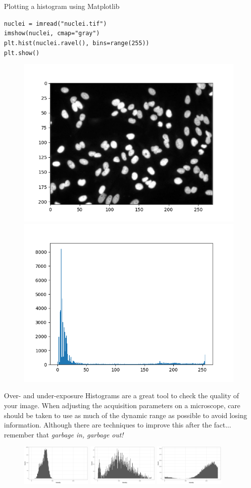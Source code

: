 \documentclass[9pt, aspectratio=169]{beamer}
\begin{document}
\begin{frame}
	{Plotting a histogram using Matplotlib}

	\begin{codebox}
		\texttt{nuclei = imread("nuclei.tif")\\
			imshow(nuclei, cmap="gray")\\
			plt.hist(nuclei.ravel(), bins=range(255))\\
			plt.show()}
	\end{codebox}

	\begin{figure}
		\centering
		\includegraphics[width=.4\textwidth]{nuclei.png}
		\includegraphics[width=.4\textwidth]{histonuclei.png}
	\end{figure}
\end{frame}

\begin{frame}
	{Over- and under-exposure}
	Histograms are a great tool to check the quality of your image. When adjusting the acquisition parameters on a microscope, care should be taken to use as much of the dynamic range as possible to avoid losing information. Although there are techniques to improve this after the fact... remember that \textit{garbage in, garbage out!}
	\begin{figure}
		\centering
		\includegraphics[width=130px]{underexposed.png}
		\includegraphics[width=130px]{normalexp.png}
		\includegraphics[width=130px]{overexposed.png}
	\end{figure}
\end{frame}
\end{document}
